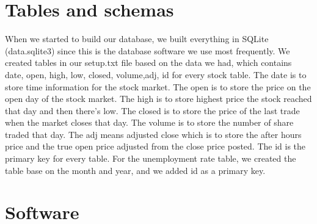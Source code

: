 \documentclass[12pt]{report}
\begin{document}
\section{Tables and schemas}
When we started to build our database, we built everything in SQLite (data.sqlite3) since this is the database software we use most frequently. We created tables in our setup.txt file based on the data we had, which contains date, open, high, low, closed, volume,adj, id for every stock table. The date is to store time information for the stock market. The open is to store the price on the open day of the stock market. The high is to store highest price the stock reached that day and then there's low. The closed is to store the price of the last trade when the market closes that day. The volume is to store the number of share traded that day. The adj means adjusted close which is to store the after hours price and the true open price adjusted from the close price posted. The id is the primary key for every table. For the unemployment rate table, we created the table base on the month and year, and we added id as a primary key. 
\section{ Software}
\end{document}
